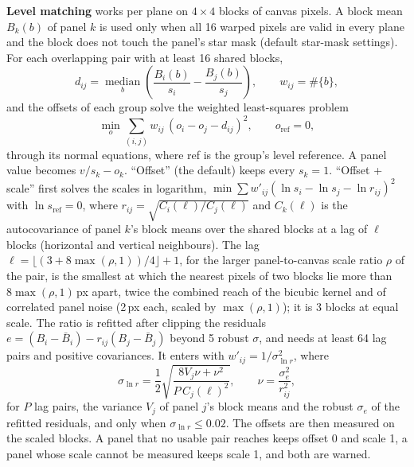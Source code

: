 \documentclass[11pt,a4paper]{article}
\begin{document}
    \textbf{Level matching} works per plane on $4 \times 4$ blocks of canvas pixels. A block mean $B_k(b)$ of panel $k$ is used only when all 16 warped pixels are valid in every plane and the block does not touch the panel's star mask (default star-mask settings). For each overlapping pair with at least 16 shared blocks,
    \begin{equation}
        d_{ij} = \operatorname*{median}_{b}\left(\frac{B_i(b)}{s_i} - \frac{B_j(b)}{s_j}\right), \qquad w_{ij} = \#\{b\},
    \end{equation}
    and the offsets of each group solve the weighted least-squares problem
    \begin{equation}
        \min_{o} \sum_{(i,j)} w_{ij}\,(o_i - o_j - d_{ij})^2, \qquad o_{\text{ref}} = 0,
    \end{equation}
    through its normal equations, where ref is the group's level reference. A panel value becomes $v / s_k - o_k$. ``Offset'' (the default) keeps every $s_k = 1$. ``Offset + scale'' first solves the scales in logarithm, $\min \sum w'_{ij} (\ln s_i - \ln s_j - \ln r_{ij})^2$ with $\ln s_{\text{ref}} = 0$, where $r_{ij} = \sqrt{C_i(\ell) / C_j(\ell)}$ and $C_k(\ell)$ is the autocovariance of panel $k$'s block means over the shared blocks at a lag of $\ell$ blocks (horizontal and vertical neighbours). The lag $\ell = \lfloor (3 + 8\max(\rho, 1)) / 4 \rfloor + 1$, for the larger panel-to-canvas scale ratio $\rho$ of the pair, is the smallest at which the nearest pixels of two blocks lie more than $8\max(\rho, 1)$\,px apart, twice the combined reach of the bicubic kernel and of correlated panel noise (2\,px each, scaled by $\max(\rho, 1)$); it is 3 blocks at equal scale. The ratio is refitted after clipping the residuals $e = (B_i - \bar{B}_i) - r_{ij}(B_j - \bar{B}_j)$ beyond 5 robust $\sigma$, and needs at least 64 lag pairs and positive covariances. It enters with $w'_{ij} = 1/\sigma_{\ln r}^2$, where
    \begin{equation}
        \sigma_{\ln r} = \frac{1}{2} \sqrt{\frac{8 V_j \nu + \nu^2}{P\, C_j(\ell)^2}}, \qquad \nu = \frac{\sigma_e^2}{r_{ij}^2},
    \end{equation}
    for $P$ lag pairs, the variance $V_j$ of panel $j$'s block means and the robust $\sigma_e$ of the refitted residuals, and only when $\sigma_{\ln r} \le 0.02$. The offsets are then measured on the scaled blocks. A panel that no usable pair reaches keeps offset 0 and scale 1, a panel whose scale cannot be measured keeps scale 1, and both are warned.
\end{document}
